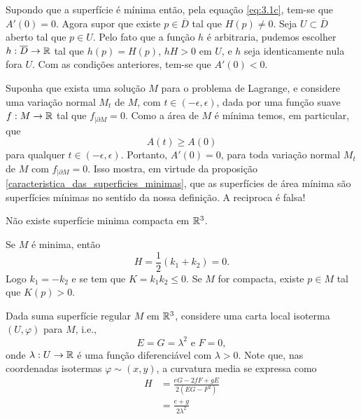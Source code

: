 \begin{demonstracao}
	Supondo que a superfície é mínima então, pela equação \eqref{eq:3.1c}, tem-se que $A'(0) = 0$.
	Agora supor que existe $p \in \overline{D}$ tal que $H(p) \neq 0$. 
	Seja $U \subset \overline{D}$ aberto tal que $p \in U$. 
	Pelo fato que a função $h$ é arbitraria, pudemos escolher $h: \overline{D} \rightarrow \mathbb R$ tal que $h(p) = H(p)$, $hH > 0$ em  $U$, e $h$ seja identicamente nula fora $U$. 
	Com as condições anteriores, tem-se que $A'(0) < 0$.
\end{demonstracao}
	Suponha que exista uma solução $M$ para o problema de Lagrange, e considere uma variação normal $M_t$ de $M$, com $t \in (-\epsilon,\epsilon)$, dada por uma função suave $f: M \rightarrow \mathbb{R}$ tal que $f_{|\partial M} = 0$. Como a área de $M$ é mínima temos, em particular, que
	\begin{equation*}
	A(t) \geq A(0)
	\end{equation*}
	para qualquer $t \in (-\epsilon,\epsilon)$. Portanto, $A'(0)=0$, para toda variação normal $M_t$ de $M$ com $f_{|\partial M}=0$.
	Isso mostra, em virtude da proposição \ref{caracteristica_das_superficies_minimas}, que as superfícies de área mínima são superfícies mínimas no sentido da nossa definição. A reciproca é falsa!

\begin{proposicao}
	Não existe superfície minima compacta em $\mathbb{R}^3$.
\end{proposicao}

\begin{demonstracao}
	Se $M$ é minima, então
	\begin{equation*}
	H = \frac{1}{2} (k_1 + k_2) = 0.
	\end{equation*}
	Logo $k_1 = -k_2$ e se tem que $K = k_1 k_2 \leq 0$.
	Se $M$ for compacta, existe $p \in M$ tal que $K(p) > 0$.
\end{demonstracao}
Dada suma superfície regular $M$ em $\mathbb{R}^3$, considere uma carta local isoterma $(U,\varphi)$ para $M$, i.e., 
\begin{equation*}
E = G = \lambda^2 \text{ e } F=0,
\end{equation*}
onde $\lambda: U \rightarrow \mathbb{R}$ é uma função diferenciável com $\lambda > 0$. Note que, nas coordenadas isotermas $\varphi \sim (x,y)$, a curvatura media se expressa como
\begin{align*}
H &= \frac{eG - 2fF + gE}{2(EG - F^2)}\\
&= \frac{e + g}{2 \lambda^2}
\end{align*}

